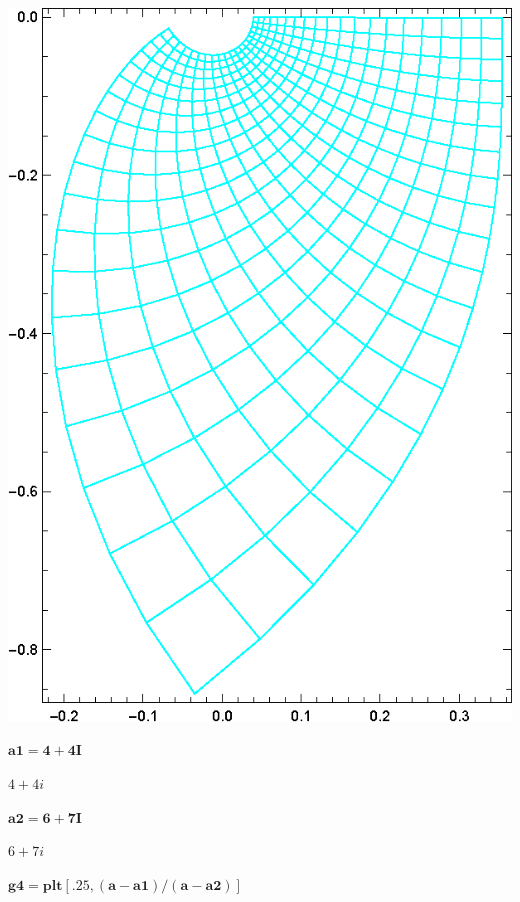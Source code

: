 \documentclass{article}
\begin{document}
\includegraphics{functions_on_complex-plane_gr13.eps}

\begin{doublespace}
\noindent\(\pmb{\text{a1}=4+4I}\)
\end{doublespace}

\begin{doublespace}
\noindent\(4+4 i\)
\end{doublespace}

\begin{doublespace}
\noindent\(\pmb{\text{a2}=6+7I}\)
\end{doublespace}

\begin{doublespace}
\noindent\(6+7 i\)
\end{doublespace}

\begin{doublespace}
\noindent\(\pmb{\text{g4}=\text{plt}[.25,(a-\text{a1})/(a-\text{a2})]}\)
\end{doublespace}
\end{document}
